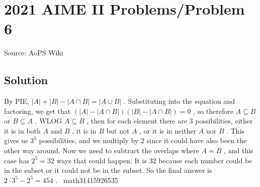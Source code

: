 \documentclass[12pt]{article}
\begin{document}
\section*{{2021 AIME II Problems/Problem 6}}
Source: AoPS Wiki

\subsection*{Solution}
By PIE, $|A|+|B|-|A \cap B| = |A \cup B|$ . Substituting into the equation and factoring, we get that $(|A| - |A \cap B|)(|B| - |A \cap B|) = 0$ , so therefore $A \subseteq B$ or $B \subseteq A$ . WLOG $A\subseteq B$ , then for each element there are $3$ possibilities, either it is in both $A$ and $B$ , it is in $B$ but not $A$ , or it is in neither $A$ nor $B$ . This gives us $3^{5}$ possibilities, and we multiply by $2$ since it could have also been the other way around. Now we need to subtract the overlaps where $A=B$ , and this case has $2^{5}=32$ ways that could happen. It is $32$ because each number could be in the subset or it could not be in the subset. So the final answer is $2\cdot 3^5 - 2^5 = \boxed{454}$ . ~math31415926535
\end{document}
